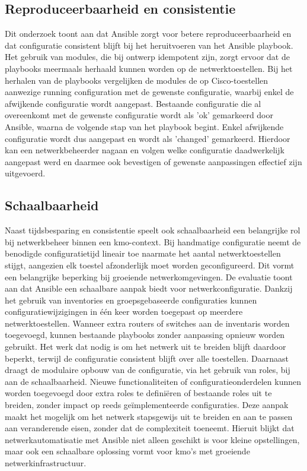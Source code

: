 \subsection{Reproduceerbaarheid en consistentie}
Dit onderzoek toont aan dat Ansible zorgt voor betere reproduceerbaarheid en dat configuratie consistent blijft bij het heruitvoeren van het Ansible playbook.
Het gebruik van modules, die bij ontwerp idempotent zijn, zorgt ervoor dat de playbooks meermaals herhaald kunnen worden op de netwerktoestellen.
Bij het herhalen van de playbooks vergelijken de modules de op Cisco-toestellen aanwezige running configuration met de gewenste configuratie, waarbij enkel de afwijkende configuratie wordt aangepast.
Bestaande configuratie die al overeenkomt met de gewenste configuratie wordt als 'ok' gemarkeerd door Ansible, waarna de volgende stap van het playbook begint.
Enkel afwijkende configuratie wordt dus aangepast en wordt als 'changed' gemarkeerd.
Hierdoor kan een netwerkbeheerder nagaan en volgen welke configuratie daadwerkelijk aangepast werd en daarmee ook bevestigen of gewenste aanpassingen effectief zijn uitgevoerd.

\subsection{Schaalbaarheid}
Naast tijdsbesparing en consistentie speelt ook schaalbaarheid een belangrijke rol bij netwerkbeheer binnen een kmo-context.
Bij handmatige configuratie neemt de benodigde configuratietijd lineair toe naarmate het aantal netwerktoestellen stijgt, aangezien elk toestel afzonderlijk moet worden geconfigureerd.
Dit vormt een belangrijke beperking bij groeiende netwerkomgevingen.
De evaluatie toont aan dat Ansible een schaalbare aanpak biedt voor netwerkconfiguratie.
Dankzij het gebruik van inventories en groepsgebaseerde configuraties kunnen configuratiewijzigingen in één keer worden toegepast op meerdere netwerktoestellen.
Wanneer extra routers of switches aan de inventaris worden toegevoegd, kunnen bestaande playbooks zonder aanpassing opnieuw worden gebruikt.
Het werk dat nodig is om het netwerk uit te breiden blijft daardoor beperkt, terwijl de configuratie consistent blijft over alle toestellen.
Daarnaast draagt de modulaire opbouw van de configuratie, via het gebruik van roles, bij aan de schaalbaarheid.
Nieuwe functionaliteiten of configuratieonderdelen kunnen worden toegevoegd door extra roles te definiëren of bestaande roles uit te breiden, zonder impact op reeds geïmplementeerde configuraties.
Deze aanpak maakt het mogelijk om het netwerk stapsgewijs uit te breiden en aan te passen aan veranderende eisen, zonder dat de complexiteit toeneemt.
Hieruit blijkt dat netwerkautomatisatie met Ansible niet alleen geschikt is voor kleine opstellingen, maar ook een schaalbare oplossing vormt voor kmo's met groeiende netwerkinfrastructuur.

